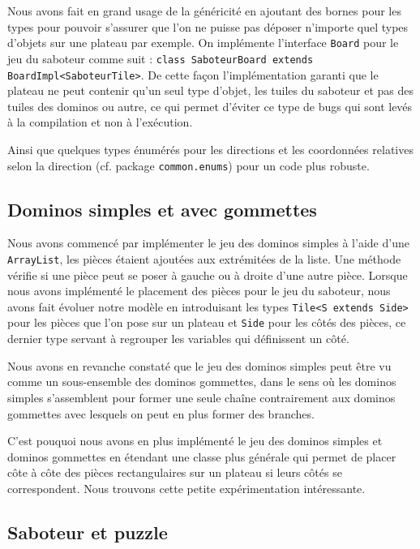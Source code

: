 \documentclass[a4paper, 11pt, DIV=9]{scrartcl}
\begin{document}
Nous avons fait en grand usage de la généricité en ajoutant des bornes pour les
types pour pouvoir s'assurer que l'on ne puisse pas déposer n'importe quel types
d'objets sur une plateau par exemple. On implémente l'interface \texttt{Board}
pour le jeu du saboteur comme suit : \texttt{class SaboteurBoard extends BoardImpl<SaboteurTile>}. De cette façon l'implémentation garanti que le
plateau ne peut contenir qu'un seul type d'objet, les tuiles du saboteur et pas
des tuiles des dominos ou autre, ce qui permet d'éviter ce type de bugs qui sont
levés à la compilation et non à l'exécution.

Ainsi que quelques types énumérés pour les directions et les coordonnées
relatives selon la direction (cf. package \texttt{common.enums}) pour un code
plus robuste.

\subsection{Dominos simples et avec gommettes}
Nous avons commencé par implémenter le jeu des dominos simples à l'aide d'une
\texttt{ArrayList}, les pièces étaient ajoutées aux extrémitées de la liste. Une
méthode vérifie si une pièce peut se poser à gauche ou à droite d'une autre
pièce. Lorsque nous avons implémenté le placement des pièces pour le jeu du
saboteur, nous avons fait évoluer notre modèle en introduisant les types \texttt{Tile<S
extends Side>} pour les pièces que l'on pose sur un plateau et \texttt{Side}
pour les côtés des pièces, ce dernier type servant à regrouper les variables qui
définissent un côté. 

Nous avons en revanche constaté que le jeu des dominos simples peut être vu
comme un sous-ensemble des dominos gommettes, dans le sens où les dominos
simples s'assemblent pour former une seule chaîne contrairement aux dominos
gommettes avec lesquels on peut en plus former des branches.

C'est pouquoi nous avons en plus implémenté le jeu des dominos simples et dominos
gommettes en étendant une classe plus générale qui permet de placer côte à côte
des pièces rectangulaires sur un plateau si leurs côtés se correspondent.
Nous trouvons cette petite expérimentation intéressante.

%

\subsection{Saboteur et puzzle}
\end{document}
